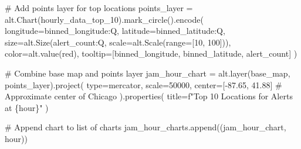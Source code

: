 \documentclass[
  letterpaper,
  DIV=11,
  numbers=noendperiod]{scrartcl}
\newenvironment{Shaded}{\begin{snugshade}}{\end{snugshade}}
\newcommand{\BuiltInTok}[1]{\textcolor[rgb]{0.00,0.23,0.31}{#1}}
\newcommand{\CommentTok}[1]{\textcolor[rgb]{0.37,0.37,0.37}{#1}}
\newcommand{\DecValTok}[1]{\textcolor[rgb]{0.68,0.00,0.00}{#1}}
\newcommand{\FloatTok}[1]{\textcolor[rgb]{0.68,0.00,0.00}{#1}}
\newcommand{\NormalTok}[1]{\textcolor[rgb]{0.00,0.23,0.31}{#1}}
\newcommand{\OperatorTok}[1]{\textcolor[rgb]{0.37,0.37,0.37}{#1}}
\newcommand{\SpecialCharTok}[1]{\textcolor[rgb]{0.37,0.37,0.37}{#1}}
\newcommand{\SpecialStringTok}[1]{\textcolor[rgb]{0.13,0.47,0.30}{#1}}
\newcommand{\StringTok}[1]{\textcolor[rgb]{0.13,0.47,0.30}{#1}}
\begin{document}
\begin{Shaded}
\begin{Highlighting}[]
    \CommentTok{\# Add points layer for top locations}
\NormalTok{    points\_layer }\OperatorTok{=}\NormalTok{ alt.Chart(hourly\_data\_top\_10).mark\_circle().encode(}
\NormalTok{        longitude}\OperatorTok{=}\StringTok{\textquotesingle{}binned\_longitude:Q\textquotesingle{}}\NormalTok{,}
\NormalTok{        latitude}\OperatorTok{=}\StringTok{\textquotesingle{}binned\_latitude:Q\textquotesingle{}}\NormalTok{,}
\NormalTok{        size}\OperatorTok{=}\NormalTok{alt.Size(}\StringTok{\textquotesingle{}alert\_count:Q\textquotesingle{}}\NormalTok{, scale}\OperatorTok{=}\NormalTok{alt.Scale(}\BuiltInTok{range}\OperatorTok{=}\NormalTok{[}\DecValTok{10}\NormalTok{, }\DecValTok{100}\NormalTok{])),}
\NormalTok{        color}\OperatorTok{=}\NormalTok{alt.value(}\StringTok{\textquotesingle{}red\textquotesingle{}}\NormalTok{),}
\NormalTok{        tooltip}\OperatorTok{=}\NormalTok{[}\StringTok{\textquotesingle{}binned\_longitude\textquotesingle{}}\NormalTok{, }\StringTok{\textquotesingle{}binned\_latitude\textquotesingle{}}\NormalTok{, }\StringTok{\textquotesingle{}alert\_count\textquotesingle{}}\NormalTok{]}
\NormalTok{    )}

    \CommentTok{\# Combine base map and points layer}
\NormalTok{    jam\_hour\_chart }\OperatorTok{=}\NormalTok{ alt.layer(base\_map, points\_layer).project(}
        \BuiltInTok{type}\OperatorTok{=}\StringTok{\textquotesingle{}mercator\textquotesingle{}}\NormalTok{,}
\NormalTok{        scale}\OperatorTok{=}\DecValTok{50000}\NormalTok{,}
\NormalTok{        center}\OperatorTok{=}\NormalTok{[}\OperatorTok{{-}}\FloatTok{87.65}\NormalTok{, }\FloatTok{41.88}\NormalTok{]  }\CommentTok{\# Approximate center of Chicago}
\NormalTok{    ).properties(}
\NormalTok{        title}\OperatorTok{=}\SpecialStringTok{f"Top 10 Locations for Alerts at }\SpecialCharTok{\{}\NormalTok{hour}\SpecialCharTok{\}}\SpecialStringTok{"}
\NormalTok{    )}

    \CommentTok{\# Append chart to list of charts}
\NormalTok{    jam\_hour\_charts.append((jam\_hour\_chart, hour))}
\end{Highlighting}
\end{Shaded}
\end{document}
